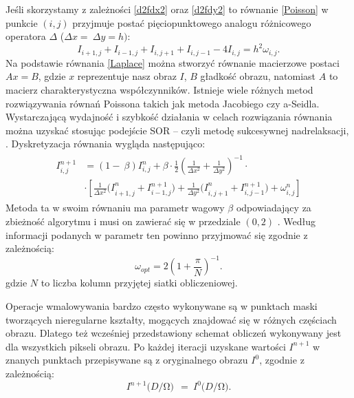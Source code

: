 \documentclass[12pt, twoside, openany]{report}
\theoremstyle{definition}
\begin{document}
Jeśli skorzystamy z zależności \eqref{d2fdx2} oraz \eqref{d2fdy2} to równanie \eqref{Poisson} w punkcie $(i,j)$ przyjmuje postać pięciopunktowego analogu różnicowego operatora $\Delta $ ($\Delta x=\ \Delta y=h)$:
\begin{equation}
I_{i+1,j}+I_{i-1,j}+I_{i,j+1}+I_{i,j-1}-4I_{i,j}=h^2{\omega }_{i,j}
\label{Laplace}
.
\end{equation}
Na podstawie równania \eqref{Laplace} można stworzyć równanie macierzowe postaci $Ax=B$, gdzie $x$ reprezentuje nasz obraz $I$, $B$ gładkość obrazu, natomiast $A$ to macierz charakterystyczna współczynników. Istnieje wiele różnych metod rozwiązywania równań Poissona takich jak metoda Jacobiego czy 
a-Seidla.  Wystarczającą wydajność i szybkość działania w celach rozwiązania równania można uzyskać stosując podejście SOR – czyli metodę sukcesywnej nadrelaksacji, \cite{blacksuccessive}. Dyskretyzacja równania wygląda następująco:
\begin{align}
\begin{aligned}
I^{n+1}_{i,j}
&= \left(1-\ \beta \right)I^n_{i,j}+\beta \cdot \frac{1}{2}{\left(\frac{1}{\Delta x^2}+\frac{1}{\Delta y^2}\right)}^{-1} \cdot \\[1ex]
&\cdot \left[\frac{1}{\Delta x^2}{(I}^n_{i+1,j}+I^{n+1}_{i-1,j})+\frac{1}{\Delta y^2}{(I}^n_{i,j+1}+I^{n+1}_{i,j-1})+{\omega }^n_{i,j}\right]
\end{aligned}
\label{DiscreteSOR}
\end{align}
Metoda ta w swoim równaniu ma parametr wagowy $\beta$ odpowiadający za zbieżność algorytmu i musi on zawierać się w przedziale $(0,2)$ \cite{neumann1981kahan}. Według informacji podanych w  \cite{blacksuccessive} parametr ten powinno przyjmować się zgodnie z zależnością:
\begin{equation}
{\omega }_{opt}=2{\left(1+\frac{\pi }{N}\right)}^{-1}
\label{BetaChoose}
.
\end{equation}
gdzie $N$ to liczba kolumn przyjętej siatki obliczeniowej. 
\par
Operacje wmalowywania bardzo często wykonywane są w punktach maski tworzących nieregularne kształty, mogących znajdować się w różnych częściach obrazu. Dlatego też wcześniej przedstawiony schemat obliczeń wykonywany jest dla wszystkich pikseli obrazu. Po każdej iteracji uzyskane wartości $I^{n+1}$ w znanych punktach przepisywane są z oryginalnego obrazu $I^{0}$, zgodnie z zależnością:
\begin{equation}
I^{n+1}(D/\mathrm{\Omega }\mathrm{)\ }\ ={\ I}^0(D/\mathrm{\Omega }\mathrm{)}.
\label{retrieveMask}
\end{equation}
\end{document}
